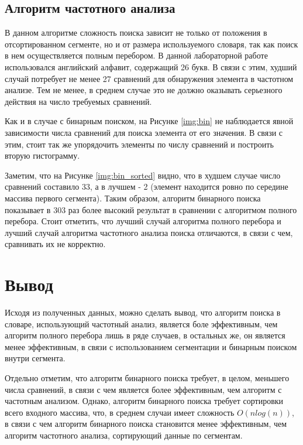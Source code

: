 \clearpage

\subsection{Алгоритм частотного анализа}

В данном алгоритме сложность поиска зависит не только от положения в отсортированном сегменте, но и от размера используемого словаря, так как поиск в нем осуществляется полным перебором. В данной лабораторной работе использовался английский алфавит, содержащий 26 букв. В связи с этим, худший случай потребует не менее 27 сравнений для обнаружения элемента в частотном анализе. Тем не менее, в среднем случае это не должно оказывать серьезного действия на число требуемых сравнений.


Как и в случае с бинарным поиском, на Рисунке \ref{img:bin} не наблюдается явной зависимости числа сравнений для поиска элемента от его значения. В связи с этим, стоит так же упорядочить элементы по числу сравнений и построить вторую гистограмму.

\clearpage


Заметим, что на Рисунке \ref{img:bin_sorted} видно, что в худшем случае число сравнений составило 33, а в лучшем - 2 (элемент находится ровно по середине массива первого сегмента). Таким образом, алгоритм бинарного поиска показывает в 303 раз более высокий результат в сравнении с алгоритмом полного перебора. Стоит отметить, что лучший случай алгоритма полного перебора и лучший случай алгоритма частотного анализа поиска отличаются, в связи с чем, сравнивать их не корректно.

\section{Вывод}

Исходя из полученных данных, можно сделать вывод, что алгоритм поиска в словаре, использующий частотный анализ, является боле эффективным, чем алгоритм полного перебора лишь в ряде случаев, в остальных же, он является менее эффективным, в связи с использованием сегментации и бинарным поиском внутри сегмента.

Отдельно отметим, что алгоритм бинарного поиска требует, в целом, меньшего числа сравнений, в связи с чем является более эффективным, чем алгоритм с частотным анализом. Однако, алгоритм бинарного поиска требует сортировки всего входного массива, что, в среднем случаи имеет сложность $O(nlog(n))$, в связи с чем алгоритм бинарного поиска становится менее эффективным, чем алгоритм частотного анализа, сортирующий данные по сегментам.
